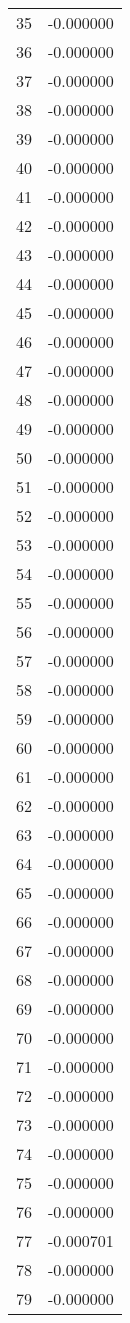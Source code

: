 \documentclass[12pt]{article}
\begin{document}
\begin{longtable}{@{}cc@{}}
35 & -0.000000 \\
36 & -0.000000 \\
37 & -0.000000 \\
38 & -0.000000 \\
39 & -0.000000 \\
40 & -0.000000 \\
41 & -0.000000 \\
42 & -0.000000 \\
43 & -0.000000 \\
44 & -0.000000 \\
45 & -0.000000 \\
46 & -0.000000 \\
47 & -0.000000 \\
48 & -0.000000 \\
49 & -0.000000 \\
50 & -0.000000 \\
51 & -0.000000 \\
52 & -0.000000 \\
53 & -0.000000 \\
54 & -0.000000 \\
55 & -0.000000 \\
56 & -0.000000 \\
57 & -0.000000 \\
58 & -0.000000 \\
59 & -0.000000 \\
60 & -0.000000 \\
61 & -0.000000 \\
62 & -0.000000 \\
63 & -0.000000 \\
64 & -0.000000 \\
65 & -0.000000 \\
66 & -0.000000 \\
67 & -0.000000 \\
68 & -0.000000 \\
69 & -0.000000 \\
70 & -0.000000 \\
71 & -0.000000 \\
72 & -0.000000 \\
73 & -0.000000 \\
74 & -0.000000 \\
75 & -0.000000 \\
76 & -0.000000 \\
77 & -0.000701 \\
78 & -0.000000 \\
79 & -0.000000 \\

\end{longtable}
\end{document}
